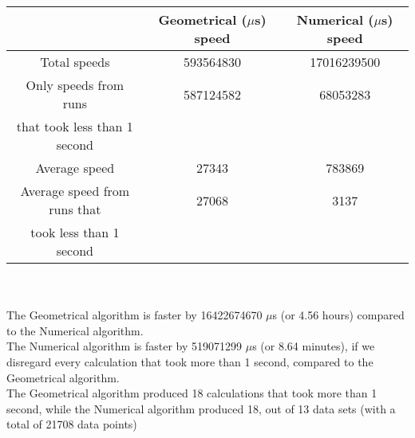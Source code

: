 \begin{tabular}[3]{c|c|c}
 & Geometrical ($\mu$s) speed & Numerical ($\mu$s) speed\\
\hline
Total speeds & 593564830 & 17016239500 \\ 
\hline 
Only speeds from runs & 587124582 & 68053283 \\ 
that took less than 1 second & & \\ 
\hline
Average speed & 27343 & 783869 \\
\hline
Average speed from runs that & 27068 & 3137 \\ 
took less than 1 second & & \\ 
\end{tabular}\\ \\
The Geometrical algorithm is faster by 16422674670 $\mu$s (or 4.56 hours) compared to the Numerical algorithm.\\
The Numerical algorithm is faster by 519071299 $\mu$s (or 8.64 minutes), if we disregard every calculation that took more than 1 second, compared to the Geometrical algorithm.\\
The Geometrical algorithm produced 18 calculations that took more than 1 second, while the Numerical algorithm produced 18, out of 13 data sets (with a total of 21708 data points)\\
